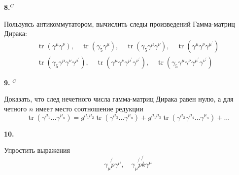 \documentclass[a4paper,12pt]{article} %
\begin{document}
\begin{task}\textbf{8.}$^{C}$ 
	
	Пользуясь антикоммутатором, вычислить следы произведений Гамма-матриц Дирака:
$$
\begin{array}{l}
\operatorname{tr}\left(\gamma^{\mu} \gamma^{\nu}\right), 
\quad 
\operatorname{tr}\left(\gamma_{5} \gamma^{\mu}\right), 
\quad 
\operatorname{tr}\left(\gamma_{5} \gamma^{\mu} \gamma^{\nu}\right), 
\quad 
\operatorname{tr}\left(\gamma^{\mu} \gamma^{\nu} \gamma^{\mu^{\prime}}\right) 
\\
\operatorname{tr}\left(\gamma_{5} \gamma^{\mu} \gamma^{\nu} \gamma^{\mu^{\prime}}\right), 
\quad 
\operatorname{tr}\left(\gamma^{\mu} \gamma^{\nu} \gamma^{\mu^{\prime}} \gamma^{\nu^{\prime}}\right), 
\quad 
\operatorname{tr}\left(\gamma_{5} \gamma^{\mu} \gamma^{\nu} \gamma^{\mu^{\prime}} \gamma^{\nu^{\prime}}\right)
\end{array}
$$












\end{task}



\begin{task}\textbf{9.} $^{C}$ 

Доказать, что след нечетного числа гамма-матриц Дирака равен нулю, а для четного $n$ имеет место соотношение редукции
$$
\operatorname{tr}\left(\gamma^{\mu_{1}} \ldots \gamma^{\mu_{n}}\right)=
g^{\mu_{1} \mu_{2}} \operatorname{tr}\left(\gamma^{\mu_{3}} \ldots \gamma^{\mu_{n}}\right)+
g^{\mu_{1} \mu_{3}} \operatorname{tr}\left(\gamma^{\mu_{2}} \gamma^{\mu_{4}} \ldots \gamma^{\mu_{n}}\right)+
\ldots
$$







\end{task}



\begin{task} \textbf{10.} 

Упростить выражения
$$
\gamma_{\mu} \not{p} \gamma^{\mu}, \quad \gamma_{\mu} \not{p} \not{k} \gamma^{\mu}
$$






\end{task}
\end{document}
